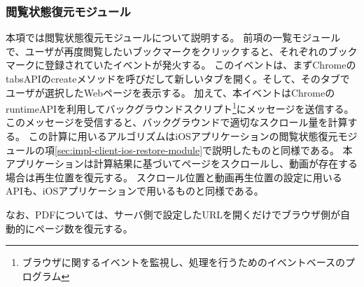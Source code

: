 \subsubsection{閲覧状態復元モジュール}
本項では閲覧状態復元モジュールについて説明する。
前項の一覧モジュールで、ユーザが再度閲覧したいブックマークをクリックすると、それぞれのブックマークに登録されていたイベントが発火する。
このイベントは、まずChromeのtabsAPIのcreateメソッドを呼びだして新しいタブを開く。そして、そのタブでユーザが選択したWebページを表示する。
加えて、本イベントはChromeのruntimeAPI\cite{chrome-runtime-api}を利用してバックグラウンドスクリプト\footnote{ブラウザに関するイベントを監視し、処理を行うためのイベントベースのプログラム}にメッセージを送信する。
このメッセージを受信すると、バックグラウンドで適切なスクロール量を計算する。
この計算に用いるアルゴリズムはiOSアプリケーションの閲覧状態復元モジュールの項\ref{sec:impl-client-ios-restore-module}で説明したものと同様である。
本アプリケーションは計算結果に基づいてページをスクロールし、動画が存在する場合は再生位置を復元する。
スクロール位置と動画再生位置の設定に用いるAPIも、iOSアプリケーションで用いるものと同様である。

なお、PDFについては、サーバ側で設定したURLを開くだけでブラウザ側が自動的にページ数を復元する。
